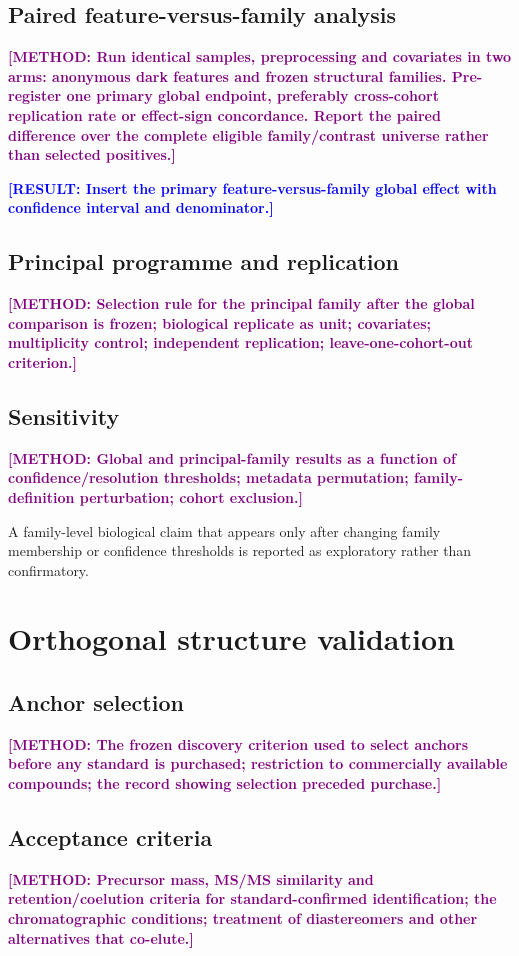 \documentclass[12pt]{article}
\newcommand{\result}[1]{\textbf{\textcolor{blue}{[RESULT: #1]}}}
\newcommand{\methodtodo}[1]{\textbf{\textcolor{purple}{[METHOD: #1]}}}
\begin{document}
\subsection{Paired feature-versus-family analysis}
\methodtodo{Run identical samples, preprocessing and covariates in two arms: anonymous dark features and frozen structural families. Pre-register one primary global endpoint, preferably cross-cohort replication rate or effect-sign concordance. Report the paired difference over the complete eligible family/contrast universe rather than selected positives.}

\result{Insert the primary feature-versus-family global effect with confidence interval and denominator.}

\subsection{Principal programme and replication}
\methodtodo{Selection rule for the principal family after the global comparison is frozen; biological replicate as unit; covariates; multiplicity control; independent replication; leave-one-cohort-out criterion.}

\subsection{Sensitivity}
\methodtodo{Global and principal-family results as a function of confidence/resolution thresholds; metadata permutation; family-definition perturbation; cohort exclusion.}

A family-level biological claim that appears only after changing family membership or confidence thresholds is reported as exploratory rather than confirmatory.

\section{Orthogonal structure validation}

\subsection{Anchor selection}
\methodtodo{The frozen discovery criterion used to select anchors before any standard is purchased; restriction to commercially available compounds; the record showing selection preceded purchase.}

\subsection{Acceptance criteria}
\methodtodo{Precursor mass, MS/MS similarity and retention/coelution criteria for standard-confirmed identification; the chromatographic conditions; treatment of diastereomers and other alternatives that co-elute.}
\end{document}
